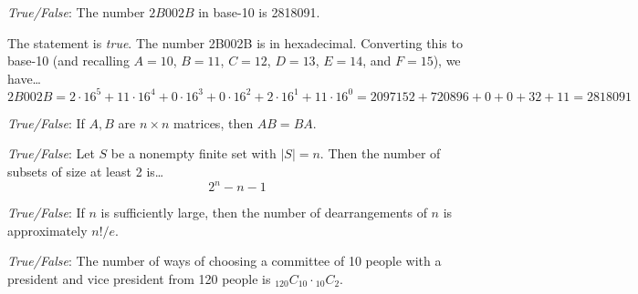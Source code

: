 \documentclass[11pt,letterpaper]{article}
\begin{document}
\quizsol \textit{True/False}: The number $2B002B$ in base-10 is 2818091. \pspace 

\sol The statement is \textit{true}. The number 2B002B is in hexadecimal. Converting this to base-10 (and recalling $A= 10$, $B= 11$, $C= 12$, $D= 13$, $E= 14$, and $F= 15$), we have\dots
	\[
	2B002B= 2 \cdot 16^5 + 11 \cdot 16^4 + 0 \cdot 16^3 + 0 \cdot 16^2 + 2 \cdot 16^1 + 11 \cdot 16^0= 2097152 + 720896 + 0 + 0 + 32 + 11= 2818091
	\]



\quizsol \textit{True/False}: If $A, B$ are $n \times n$ matrices, then $AB= BA$. \pspace

\quizsol \textit{True/False}: Let $S$ be a nonempty finite set with $|S|= n$. Then the number of subsets of size at least 2 is\dots
	\[
	2^n - n - 1
	\]

\quizsol \textit{True/False}: If $n$ is sufficiently large, then the number of dearrangements of $n$ is approximately $n!/e$.


\quizsol \textit{True/False}: The number of ways of choosing a committee of 10 people with a president and vice president from 120 people is $_{120}C_{10} \cdot \phantom{}_{10} C_2$. 
\end{document}
